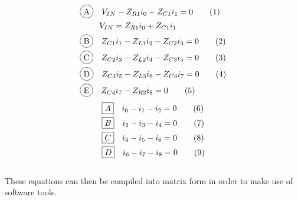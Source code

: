 \documentclass[11pt,a4paper]{article}
\newcommand*\tageq{\refstepcounter{equation}\tag{\theequation}}
\newcommand*\circled[1]{\tikz[baseline=(char.base)]{
            \node[shape=circle,draw,inner sep=2pt] (char) {#1};}}
\begin{document}
\begin{align}
	&\circled{A} \quad V_{IN} - Z_{R1}i_{0} - Z_{C1}i_{1} = 0 \tageq\label{eq:1}\\
	&\quad \quad \, \, V_{IN} = Z_{R1}i_{0} + Z_{C1}i_{1} \notag \\
	&\circled{B} \quad Z_{C1}i_{1} - Z_{L1}i_{2} - Z_{C2}i_{3} = 0 \tageq\label{eq:2}\\
	&\circled{C} \quad Z_{C2}i_{3} - Z_{L2}i_{4} - Z_{C3}i_{5} = 0 \tageq\label{eq:3}\\
	&\circled{D} \quad Z_{C3}i_{5} - Z_{L3}i_{6} - Z_{C4}i_{7} = 0 \tageq\label{eq:4}\\
	&\circled{E} \quad Z_{C4}i_{7} - Z_{R2}i_{8} = 0 \tageq\label{eq:5}
\end{align}
\begin{align}
	&\boxed{A} \quad i_{0} - i_{1} - i_{2} = 0 \tageq\label{eq:6}\\
	&\boxed{B} \quad i_{2} - i_{3} - i_{4} = 0 \tageq\label{eq:7}\\
	&\boxed{C} \quad i_{4} - i_{5} - i_{6} = 0 \tageq\label{eq:8}\\
	&\boxed{D} \quad i_{6} - i_{7} - i_{8} = 0 \tageq\label{eq:9}
\end{align}\\

These equations can then be compiled into matrix form in order to make use of software tools.\\
\end{document}
